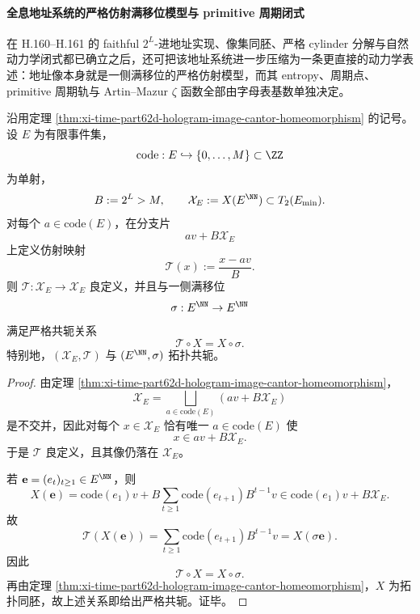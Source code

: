 \paragraph{全息地址系统的严格仿射满移位模型与 primitive 周期闭式}
在 H.160--H.161 的 faithful \(2^L\)-进地址实现、像集同胚、严格 cylinder 分解与自然动力学闭式都已确立之后，还可把该地址系统进一步压缩为一条更直接的动力学表述：地址像本身就是一侧满移位的严格仿射模型，而其 entropy、周期点、primitive 周期轨与 Artin--Mazur \(\zeta\) 函数全部由字母表基数单独决定。

\begin{theorem}[H.160--H.161 原始记号下全息地址系统与一侧满移位的严格仿射共轭]\label{thm:xi-time-part62deb-hologram-affine-fullshift-conjugacy}
沿用定理 \ref{thm:xi-time-part62d-hologram-image-cantor-homeomorphism} 的记号。设 \(E\) 为有限事件集，
\[
\mathrm{code}:E\hookrightarrow \{0,\dots,M\}\subset \ZZ
\]
为单射，
\[
B:=2^L>M,
\qquad
\mathcal X_E:=X(E^{\NN})\subset T_2(E_{\min}).
\]
对每个 \(a\in \mathrm{code}(E)\)，在分支片
\[
a v+B\mathcal X_E
\]
上定义仿射映射
\[
\mathcal T(x):=\frac{x-av}{B}.
\]
则 \(\mathcal T:\mathcal X_E\to \mathcal X_E\) 良定义，并且与一侧满移位
\[
\sigma:E^{\NN}\to E^{\NN}
\]
满足严格共轭关系
\[
\mathcal T\circ X=X\circ \sigma.
\]
特别地，\((\mathcal X_E,\mathcal T)\) 与 \((E^{\NN},\sigma)\) 拓扑共轭。
\end{theorem}
\begin{proof}
由定理 \ref{thm:xi-time-part62d-hologram-image-cantor-homeomorphism}，
\[
\mathcal X_E=
\bigsqcup_{a\in \mathrm{code}(E)}(av+B\mathcal X_E)
\]
是不交并，因此对每个 \(x\in \mathcal X_E\) 恰有唯一 \(a\in \mathrm{code}(E)\) 使
\[
x\in av+B\mathcal X_E.
\]
于是 \(\mathcal T\) 良定义，且其像仍落在 \(\mathcal X_E\)。

若 \(\mathbf e=(e_t)_{t\ge 1}\in E^{\NN}\)，则
\[
X(\mathbf e)
=
\mathrm{code}(e_1)v
+B\sum_{t\ge 1}\mathrm{code}(e_{t+1})B^{t-1}v
\in
\mathrm{code}(e_1)v+B\mathcal X_E.
\]
故
\[
\mathcal T(X(\mathbf e))
=
\sum_{t\ge 1}\mathrm{code}(e_{t+1})B^{t-1}v
=
X(\sigma\mathbf e).
\]
因此
\[
\mathcal T\circ X=X\circ \sigma.
\]
再由定理 \ref{thm:xi-time-part62d-hologram-image-cantor-homeomorphism}，\(X\) 为拓扑同胚，故上述关系即给出严格共轭。证毕。
\end{proof}

